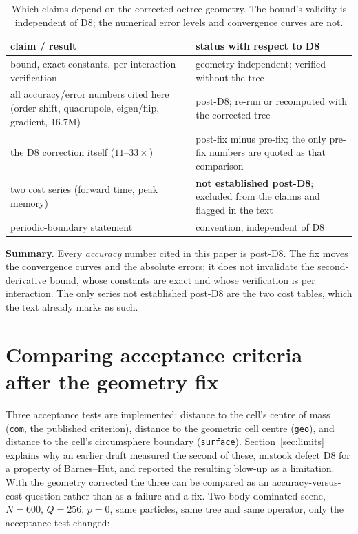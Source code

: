 \begin{table}[h]
\centering
\small
\begin{tabular}{p{}p{}}
\toprule
claim / result & status with respect to D8 \\
\midrule
bound, exact constants, per-interaction verification & geometry-independent; verified without the tree \\
all accuracy/error numbers cited here (order shift, quadrupole, eigen/flip, gradient, 16.7M) & post-D8; re-run or recomputed with the corrected tree \\
the D8 correction itself ($11$--$33\times$) & post-fix minus pre-fix; the only pre-fix numbers are quoted as that comparison \\
two cost series (forward time, peak memory) & \textbf{not established post-D8}; excluded from the claims and flagged in the text \\
periodic-boundary statement & convention, independent of D8 \\
\bottomrule
\end{tabular}
\caption{Which claims depend on the corrected octree geometry. The bound's validity is independent
of D8; the numerical error levels and convergence curves are not.}
\label{tab:d8scope}
\end{table}

\noindent\textbf{Summary.} Every \emph{accuracy} number cited in this paper is
post-D8. The fix moves the convergence curves and the absolute errors; it does not invalidate the
second-derivative bound, whose constants are exact and whose verification is per interaction. The
only series not established post-D8 are the two cost tables, which the text already marks as such.

\section{Comparing acceptance criteria after the geometry fix}\label{app:surface}
Three acceptance tests are implemented: distance to the cell's centre of mass (\texttt{com}, the
published criterion), distance to the geometric cell centre (\texttt{geo}), and distance to the
cell's circumsphere boundary (\texttt{surface}). Section~\ref{sec:limits} explains why an earlier
draft measured the second of these, mistook defect D8 for a property of Barnes--Hut, and reported
the resulting blow-up as a limitation. With the geometry corrected the three can be compared as an
accuracy-versus-cost question rather than as a failure and a fix. Two-body-dominated scene,
$N=600$, $Q=256$, $p{=}0$, same particles, same tree and same operator, only the acceptance test
changed:

